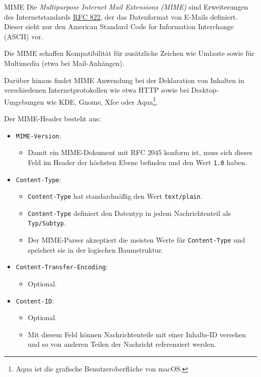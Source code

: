 \begin{defi}{MIME}
    Die \emph{Multipurpose Internet Mail Extensions (MIME)} sind Erweiterungen des Internetstandards \href{https://datatracker.ietf.org/doc/html/rfc822}{RFC 822}, der das Datenformat von E-Mails definiert. Dieser sieht nur den American Standard Code for Information Interchange (ASCII) vor.

    Die MIME schaffen Kompatibilität für zusätzliche Zeichen wie Umlaute sowie für Multimedia (etwa bei Mail-Anhängen).

    Darüber hinaus findet MIME Anwendung bei der Deklaration von Inhalten in verschiedenen Internetprotokollen wie etwa HTTP sowie bei Desktop-Umgebungen wie KDE, Gnome, Xfce oder Aqua\footnote{Aqua ist die grafische Benutzeroberfläche von macOS.}.

    Der MIME-Header besteht aus:
    \begin{itemize}
        \item \texttt{MIME-Version}:
              \begin{itemize}
                  \item Damit ein MIME-Dokument mit RFC 2045 konform ist, muss sich dieses Feld im Header der höchsten Ebene befinden und den Wert \texttt{1.0} haben.
              \end{itemize}
        \item \texttt{Content-Type}:
              \begin{itemize}
                  \item \texttt{Content-Type} hat standardmäßig den Wert \texttt{text/plain}.
                  \item \texttt{Content-Type} definiert den Datentyp in jedem Nachrichtenteil als \texttt{Typ/Subtyp}.
                  \item Der MIME-Parser akzeptiert die meisten Werte für \texttt{Content-Type} und speichert sie in der logischen Baumstruktur.
              \end{itemize}
        \item \texttt{Content-Transfer-Encoding}:
              \begin{itemize}
                  \item Optional.
              \end{itemize}
        \item \texttt{Content-ID}:
              \begin{itemize}
                  \item Optional.
                  \item Mit diesem Feld können Nachrichtenteile mit einer Inhalts-ID versehen und so von anderen Teilen der Nachricht referenziert werden.

\end{itemize}
\end{itemize}
\end{defi}
